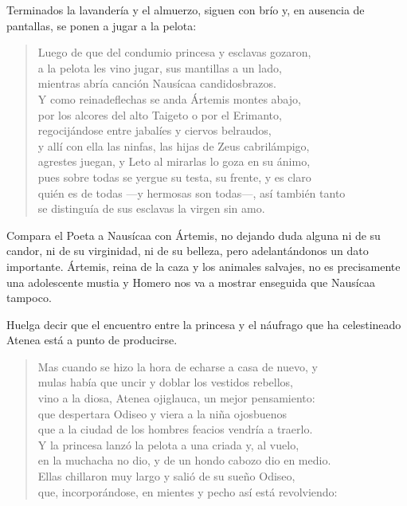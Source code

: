 \documentclass[11pt,a4paper]{article}
\begin{document}
Terminados la lavandería y el almuerzo, siguen con brío y, en ausencia de pantallas, se ponen a jugar a la pelota:

\begin{verse}
Luego de que del condumio princesa y esclavas gozaron,\\
a la pelota les vino jugar, sus mantillas a un lado,\\
mientras abría canción Nausícaa candidosbrazos.\\
Y como reinadeflechas se anda Ártemis montes abajo,\\
por los alcores del alto Taigeto o por el Erimanto,\\
regocijándose entre jabalíes y ciervos belraudos,\\
y allí con ella las ninfas, las hijas de Zeus cabrilámpigo,\\
agrestes juegan, y Leto al mirarlas lo goza en su ánimo,\\
pues sobre todas se yergue su testa, su frente, y es claro\\
quién es de todas ---y hermosas son todas---, así también tanto\\
se distinguía de sus esclavas la virgen sin amo.
\end{verse}

Compara el Poeta a Nausícaa con Ártemis, no dejando duda alguna ni de su candor, ni de su virginidad, ni de su belleza, pero adelantándonos un dato importante. Ártemis, reina de la caza y los animales salvajes, no es precisamente una adolescente mustia y Homero nos va a mostrar enseguida que Nausícaa tampoco.

Huelga decir que el encuentro entre la princesa y el náufrago que ha celestineado Atenea está a punto de producirse.

\begin{verse}
Mas cuando se hizo la hora de echarse a casa de nuevo, y\\
mulas había que uncir y doblar los vestidos rebellos,\\
vino a la diosa, Atenea ojiglauca, un mejor pensamiento:\\
que despertara Odiseo y viera a la niña ojosbuenos\\
que a la ciudad de los hombres feacios vendría a traerlo.\\
Y la princesa lanzó la pelota a una criada y, al vuelo,\\
en la muchacha no dio, y de un hondo cabozo dio en medio.\\
Ellas chillaron muy largo y salió de su sueño Odiseo,\\
que, incorporándose, en mientes y pecho así está revolviendo:
\end{verse}
\end{document}
